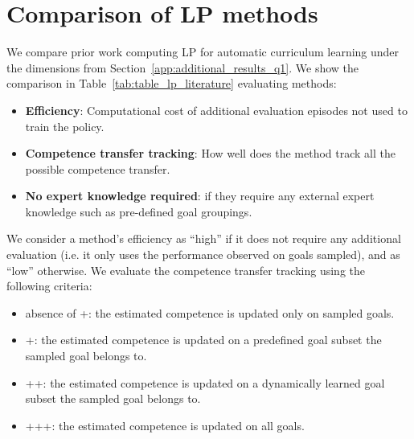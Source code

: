 \section{Comparison of LP methods} \label{app:lp_literature_review}
We compare prior work computing LP for automatic curriculum learning under the dimensions from Section~\ref{app:additional_results_q1}. We show the comparison in Table~\ref{tab:table_lp_literature} evaluating methods:
\begin{itemize}
    \item \textbf{Efficiency}: Computational cost of additional evaluation episodes not used to train the policy.
    \item \textbf{Competence transfer tracking}: How well does the method track all the possible competence transfer.
    \item \textbf{No expert knowledge required}: if they require any external expert knowledge such as pre-defined goal groupings.
\end{itemize}
We consider a method’s efficiency as “high” if it does not require any additional evaluation (i.e. it only uses the performance observed on goals sampled), and as “low” otherwise. We evaluate the competence transfer tracking using the following criteria:
\begin{itemize}[noitemsep,topsep=0pt,parsep=0pt,partopsep=0pt]
    \item absence of +: the estimated competence is updated only on sampled goals.
    \item +: the estimated competence is updated on a predefined goal subset the sampled goal belongs to.
    \item ++: the estimated competence is updated on a dynamically learned goal subset the sampled goal belongs to.
    \item +++: the estimated competence is updated on all goals.
\end{itemize}

